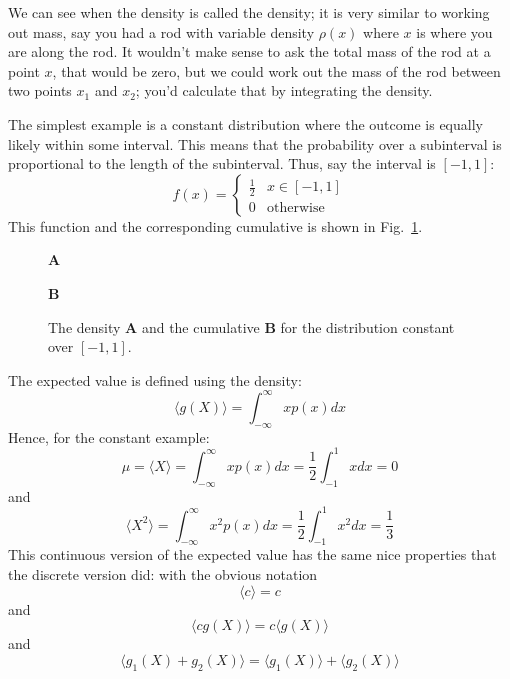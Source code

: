 \documentclass[11pt,a4paper]{scrartcl}
\begin{document}
We can see when the density is called the density; it is very similar
to working out mass, say you had a rod with variable density $\rho(x)$
where $x$ is where you are along the rod. It wouldn't make sense to
ask the total mass of the rod at a point $x$, that would be zero, but
we could work out the mass of the rod between two points $x_1$ and
$x_2$; you'd calculate that by integrating the density.

The simplest example is a constant distribution where the outcome is
equally likely within some interval. This means that the probability
over a subinterval is proportional to the length of the
subinterval. Thus, say the interval is $[-1,1]$:
\begin{equation}
f(x)=\left\{\begin{array}{ll}\frac{1}{2}&x\in [-1,1]\\0&\mbox{otherwise}\end{array}\right.
\end{equation}
This function and the corresponding cumulative is shown in Fig.~\ref{fig_const}.

\begin{figure}
\textbf{A}
\begin{center}

\end{center}
\textbf{B}
\begin{center}

\end{center}
\caption{The density \textbf{A} and the cumulative \textbf{B} for the distribution constant over $[-1,1]$.\label{fig_const}}
\end{figure}

The expected value is defined using the density:
\begin{equation}
\langle g(X)\rangle =\int_{-\infty}^\infty xp(x)dx
\end{equation}
Hence, for the constant example:
\begin{equation}
\mu=\langle X\rangle=\int_{-\infty}^\infty xp(x)dx=\frac{1}{2}\int_{-1}^1xdx=0
\end{equation}
and
\begin{equation}
\langle X^2\rangle=\int_{-\infty}^\infty x^2p(x)dx=\frac{1}{2}\int_{-1}^1x^2dx=\frac{1}{3}
\end{equation}
This continuous version of the expected value has the same nice
properties that the discrete version did: with the obvious notation
\begin{equation}
\langle c\rangle=c
\end{equation}
and
\begin{equation}
\langle cg(X)\rangle =c\langle g(X)\rangle
\end{equation}
and 
\begin{equation}
\langle g_1(X)+g_2(X)\rangle =\langle g_1(X)\rangle +\langle g_2(X)\rangle
\end{equation}
\end{document}

